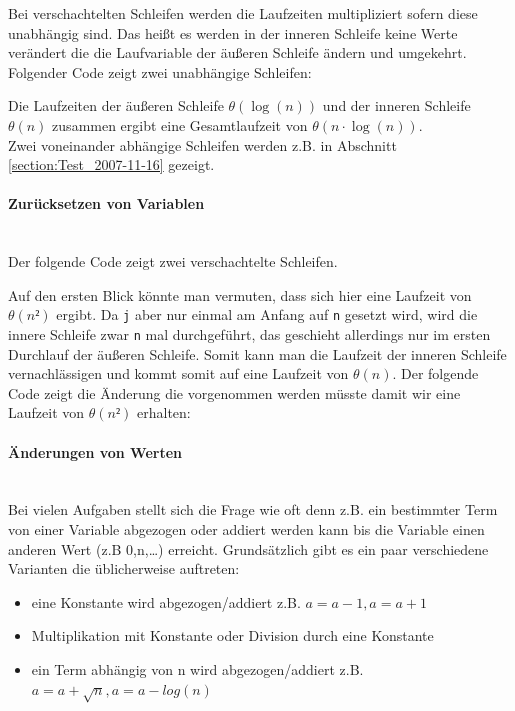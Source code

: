 \documentclass[a4paper, 12pt]{article}
\newcommand{\codeinput}[1]
{
    \begin{leftbar}
        
    \end{leftbar}
}
\begin{document}
Bei verschachtelten Schleifen werden die Laufzeiten multipliziert sofern diese
unabhängig sind. Das heißt es werden in der inneren Schleife keine Werte
verändert die die Laufvariable der äußeren Schleife ändern und umgekehrt.
Folgender Code zeigt zwei unabhängige Schleifen:

\codeinput{Independent_Loops}

Die Laufzeiten der äußeren Schleife $θ\left(\log\left(n\right)\right)$ und der
inneren Schleife $θ\left(n\right)$ zusammen ergibt eine Gesamtlaufzeit von
$θ\left( n⋅\log\left(n\right) \right)$.\\

Zwei voneinander abhängige Schleifen werden z.B. in Abschnitt
\ref{section:Test_2007-11-16} gezeigt.

\paragraph{Zurücksetzen von Variablen}~\\

Der folgende Code zeigt zwei verschachtelte Schleifen.

\codeinput{Two_Dependent_Loops}

Auf den ersten Blick könnte man vermuten, dass sich hier eine Laufzeit von
$θ\left(n²\right)$ ergibt. Da \texttt{j} aber nur einmal am Anfang auf
\texttt{n} gesetzt wird, wird die innere Schleife zwar \texttt{n} mal
durchgeführt, das geschieht allerdings nur im ersten Durchlauf der äußeren
Schleife. Somit kann man die Laufzeit der inneren Schleife vernachlässigen und
kommt somit auf eine Laufzeit von $θ\left(n\right)$. Der folgende Code zeigt
die Änderung die vorgenommen werden müsste damit wir eine Laufzeit von
$θ\left(n²\right)$ erhalten:

\codeinput{Two_Dependent_Loops_Quadratic}

\paragraph{Änderungen von Werten}~\\

Bei vielen Aufgaben stellt sich die Frage wie oft denn z.B. ein bestimmter
Term von einer Variable abgezogen oder addiert werden kann bis die Variable
einen anderen Wert (z.B 0,n,\dots) erreicht. Grundsätzlich gibt es ein paar
verschiedene Varianten die üblicherweise auftreten:

\begin{itemize}
	\item eine Konstante wird abgezogen/addiert z.B. $a=a-1, a=a+1$
	\item Multiplikation mit Konstante oder Division durch eine Konstante
	\item ein Term abhängig von n wird abgezogen/addiert z.B.\
	$a=a+\sqrt n, a=a-log\left(n\right)$
\end{itemize}
\end{document}
